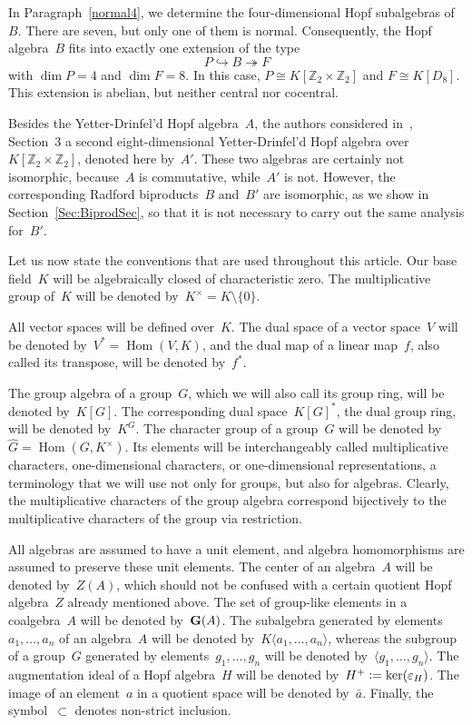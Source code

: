 \documentclass{article}
\numberwithin{equation}{section}
\theoremstyle{definition}
\theoremstyle{break}
\newcommand{\dm}{\operatorname{dim}}
\newcommand{\Hom}{\operatorname{Hom}}
\newcommand{\deq}{\vcentcolon =}
\newcommand{\1}{{(1)}}
\newcommand{\2}{{(2)}}
\newcommand{\3}{{(3)}}
\newcommand{\eh}{{\varepsilon_{H}}}
\newcommand{\Z}{{\mathbb Z}}
\begin{document}
In Paragraph~\ref{normal4}, we determine the four-dimensional Hopf subalgebras of~$B$. There are seven, but only one of them is normal. Consequently, the Hopf algebra~$B$ fits into exactly one extension of the type
\[P \hookrightarrow B \twoheadrightarrow F \]
with $\dm P = 4$ and $\dm F = 8$. In this case, $P \cong K[\Z_2\times \Z_2]$ and $F \cong K[D_8]$. This extension is abelian, but neither central nor cocentral.

Besides the Yetter-Drinfel'd Hopf algebra~$A$, the authors considered in~\cite{KaSo2}, Section~3 a second eight-dimensional Yetter-Drinfel'd Hopf algebra over \mbox{$K[\Z_2 \times \Z_2]$}, denoted here by~$A'$. These two algebras are certainly not isomorphic, because~$A$ is commutative, while~$A'$ is not. However, the corresponding Radford biproducts~$B$ and~$B'$ are isomorphic, as we show in Section~\ref{Sec:BiprodSec}, so that it is not necessary to carry out the same analysis for~$B'$.

Let us now state the conventions that are used throughout this article. Our base field~$K$ will be algebraically closed of characteristic zero. The multiplicative group of~$K$ will be denoted by~$K^\times = K \setminus \{0\}$.

All vector spaces will be defined over~$K$. The dual space of a vector space~$V$ will be denoted by~$V^* = \Hom(V,K)$, and the dual map of a linear map~$f$, also called its transpose, will be denoted by~$f^*$.

The group algebra of a group~$G$, which we will also call its group ring, will be denoted by~$K[G]$. The corresponding dual space~$K[G]^*$, the dual group ring, will be denoted by~$K^G$. The character group of a group~$G$ will be denoted by \mbox{$\hat{G} = \Hom(G,K^\times)$}. Its elements will be interchangeably called multiplicative characters, one-dimensional characters, or one-dimensional representations, a terminology that we will use not only for groups, but also for algebras. Clearly, the multiplicative characters of the group algebra correspond bijectively to the multiplicative characters of the group via restriction.

All algebras are assumed to have a unit element, and algebra homomorphisms are assumed to preserve these unit elements. The center of an algebra~$A$ will be denoted by~$Z(A)$, which should not be confused with a certain quotient Hopf algebra~$Z$ already mentioned above. The set of group-like elements in a coalgebra~$A$ will be denoted by~${\bf G}(A)$. The subalgebra generated by elements~$a_1,\ldots,a_n$ of an algebra~$A$ will be denoted by~$K \langle a_1,\ldots,a_n \rangle$, whereas the subgroup of a group~$G$ generated by elements~$g_1,\ldots,g_n$  will be denoted by~$\langle g_1,\ldots,g_n \rangle$. The augmentation ideal of a Hopf algebra~$H$ will be denoted by~$H^+ \deq \ker(\eh)$. The image of an element~$a$ in a quotient space will be denoted by~$\bar{a}$. Finally, the symbol~$\subset$ denotes non-strict inclusion.
\end{document}
